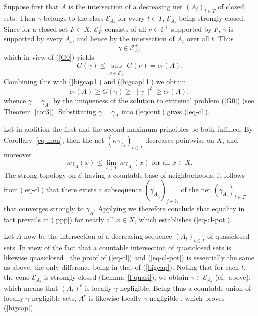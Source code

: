 \documentclass[12pt,a4paper,reqno]{amsart} %
\theoremstyle{lause}
\theoremstyle{maaritelma}
\theoremstyle{lause}
\theoremstyle{maaritelma}
\numberwithin{equation}{section}
\begin{document}
Suppose first that $A$ is the intersection of a decreasing net $(A_t)_{t\in T}$ of closed sets.
Then $\gamma$ belongs to the class $\mathcal E^+_{A_t}$ for every $t\in T$, $\mathcal E^+_{A_t}$ being strongly closed. Since for a closed set $F\subset X$, $\mathcal E^+_F$ consists of all $\nu\in\mathcal E^+$ supported by $F$, $\gamma$ is supported by every $A_t$, and hence by the intersection of $A_t$ over all $t$. Thus
\begin{equation}\label{bigcap}\gamma\in\mathcal E^+_A,\end{equation}
which in view of (\ref{G0}) yields
\[G(\gamma)\leqslant\sup_{\nu\in\mathcal E^+_A}\,G(\nu)=c_*(A).\]
Combining this with (\ref{bigcap1}) and (\ref{bigcap11}) we obtain
\[c_*(A)\geqslant G(\gamma)\geqslant\|\gamma\|^2\geqslant c_*(A),\]
whence $\gamma=\gamma_A$, by the uniqueness of the solution to extremal problem (\ref{G0}) (see Theorem~\ref{cor3}). Substituting $\gamma=\gamma_A$ into (\ref{eqcont}) gives (\ref{eq-cl}).

Let in addition the first and the second maximum principles be both fulfilled. By Corollary~\ref{eq-mon}, then the net $(\kappa\gamma_{A_t})_{t\in T}$ decreases pointwise on $X$, and moreover
\begin{equation}\label{ppp}\kappa\gamma_A(x)\leqslant\lim_{t\in T}\,\kappa\gamma_{A_t}(x)\text{ \ for all $x\in X$}.\end{equation}
The strong topology on $\mathcal E$ having a countable base of neighborhoods, it follows from (\ref{eq-cl}) that there exists a subsequence $(\gamma_{A_{t_j}})_{j\in\mathbb N}$ of the net $(\gamma_{A_t})_{t\in T}$ that converges strongly to $\gamma_A$. Applying \cite[Lemma~3.2.4]{F1} we therefore conclude that equality in fact prevails in (\ref{ppp}) for nearly all $x\in X$, which establishes (\ref{eq-cl-pot}).

Let $A$ now be the intersection of a decreasing sequence $(A_t)_{t\in T}$ of quasiclosed sets.
In view of the fact that a countable intersection of quasiclosed sets is likewise quasiclosed
\cite[Lemma~2.3]{F71}, the proof of (\ref{eq-cl}) and (\ref{eq-cl-pot}) is essentially the same as above, the only difference being in that of (\ref{bigcap}). Noting that for each $t$, the cone $\mathcal E^+_{A_t}$ is strongly closed (Lemma~\ref{l-quasi}), we obtain $\gamma\in\mathcal E^+_{A_t}$ (cf.\ above), which means that $(A_t)^c$ is locally $\gamma$-neg\-lig\-ible.
Being thus a countable union of locally $\gamma$-neg\-lig\-ible sets, $A^c$ is likewise locally $\gamma$-neg\-lig\-ible \cite[Section~IV.5.2]{B2}, which proves (\ref{bigcap}).
\end{document}
